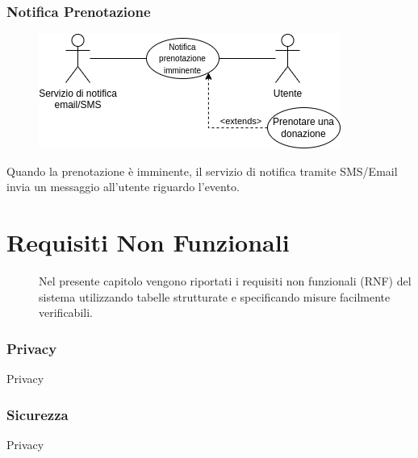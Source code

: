 \documentclass{article}
\begin{document}
\subsubsection{Notifica Prenotazione}\label{rf_11}
\begin{description}

	\begin{figure}[htp]
	\centering
	\includegraphics[]{rf11.png}
	\end{figure}
	
	\item Quando la prenotazione è imminente, il servizio di notifica tramite SMS/Email invia un messaggio all'utente riguardo l'evento.
\end{description}
\clearpage


\section{Requisiti Non Funzionali}
\begin{description}
    \item[] Nel presente capitolo vengono riportati i requisiti non funzionali (RNF) del sistema utilizzando tabelle strutturate e specificando misure facilmente verificabili. 
\end{description}

\renewcommand\thesubsubsection{RNF \arabic{subsubsection}}

\subsubsection{Privacy}\label{rnf_1}
\begin{description}
    \item Privacy
\end{description}

\subsubsection{Sicurezza}\label{rnf_2}
\begin{description}
    \item Privacy
\end{description}
\end{document}
